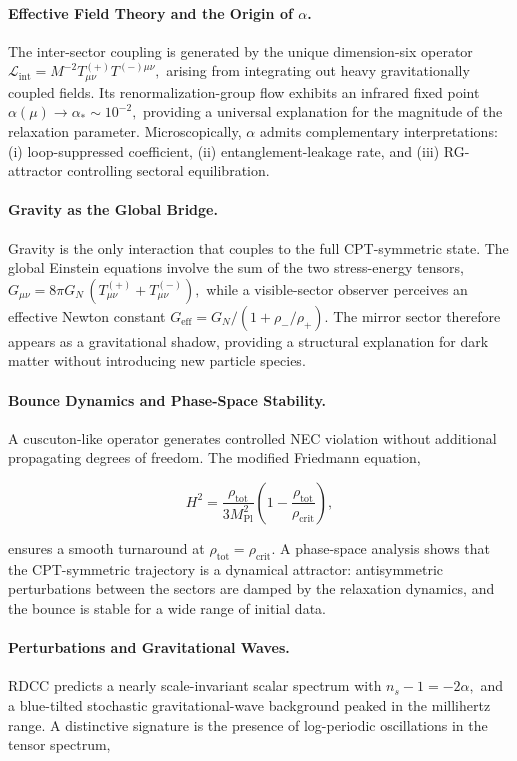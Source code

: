 \documentclass[11pt,a4paper]{article}
\begin{document}
\paragraph{Effective Field Theory and the Origin of \(\alpha\).}
The inter-sector coupling is generated by the unique dimension-six operator
\(
\mathcal{L}_{\mathrm{int}}
    = M^{-2} T^{(+)}_{\mu\nu} T^{(-)\mu\nu},
\)
arising from integrating out heavy gravitationally coupled fields. Its
renormalization-group flow exhibits an infrared fixed point
\(
\alpha(\mu) \to \alpha_{*} \sim 10^{-2},
\)
providing a universal explanation for the magnitude of the relaxation
parameter. Microscopically, \( \alpha \) admits complementary interpretations:
(i) loop-suppressed coefficient, (ii) entanglement-leakage rate, and
(iii) RG-attractor controlling sectoral equilibration.

\paragraph{Gravity as the Global Bridge.}
Gravity is the only interaction that couples to the full CPT-symmetric state.
The global Einstein equations involve the sum of the two stress-energy tensors,
\(
G_{\mu\nu} = 8\pi G_{N}\,(T^{(+)}_{\mu\nu} + T^{(-)}_{\mu\nu}),
\)
while a visible-sector observer perceives an effective Newton constant
\(
G_{\mathrm{eff}} = G_{N}/(1 + \rho_{-}/\rho_{+}).
\)
The mirror sector therefore appears as a gravitational shadow, providing a
structural explanation for dark matter without introducing new particle
species.

\paragraph{Bounce Dynamics and Phase-Space Stability.}
A cuscuton-like operator generates controlled NEC violation without additional
propagating degrees of freedom. The modified Friedmann equation,


\[
H^{2}
    = \frac{\rho_{\mathrm{tot}}}{3M_{\mathrm{Pl}}^{2}}
      \left(1 - \frac{\rho_{\mathrm{tot}}}{\rho_{\mathrm{crit}}}\right),
\]


ensures a smooth turnaround at \(\rho_{\mathrm{tot}} = \rho_{\mathrm{crit}}\).
A phase-space analysis shows that the CPT-symmetric trajectory is a dynamical
attractor: antisymmetric perturbations between the sectors are damped by the
relaxation dynamics, and the bounce is stable for a wide range of initial data.

\paragraph{Perturbations and Gravitational Waves.}
RDCC predicts a nearly scale-invariant scalar spectrum with
\(
n_{s} - 1 = -2\alpha,
\)
and a blue-tilted stochastic gravitational-wave background peaked in the
millihertz range. A distinctive signature is the presence of log-periodic
oscillations in the tensor spectrum,
\end{document}
